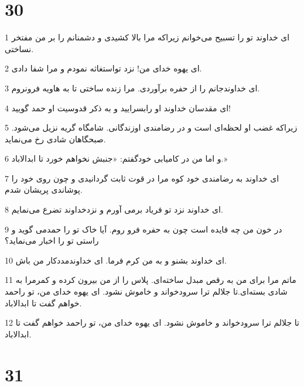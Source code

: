 \chapter{30}

\par 1 ای خداوند تو را تسبیح می‌خوانم زیراکه مرا بالا کشیدی و دشمنانم را بر من مفتخر نساختی.
\par 2 ‌ای یهوه خدای من! نزد تواستغاثه نمودم و مرا شفا دادی.
\par 3 ‌ای خداوندجانم را از حفره برآوردی. مرا زنده ساختی تا به هاویه فرونروم.
\par 4 ‌ای مقدسان خداوند او رابسرایید و به ذکر قدوسیت او حمد گویید!
\par 5 زیراکه غضب او لحظه‌ای است و در رضامندی اوزندگانی. شامگاه گریه نزیل می‌شود. صبحگاهان شادی رخ می‌نماید.
\par 6 و اما من در کامیابی خودگفتم: «جنبش نخواهم خورد تا ابدالاباد.»
\par 7 ‌ای خداوند به رضامندی خود کوه مرا در قوت ثابت گردانیدی و چون روی خود را پوشاندی پریشان شدم.
\par 8 ‌ای خداوند نزد تو فریاد برمی آورم و نزدخداوند تضرع می‌نمایم.
\par 9 در خون من چه فایده است چون به حفره فرو روم. آیا خاک تو را حمدمی گوید و راستی تو را اخبار می‌نماید؟
\par 10 ‌ای خداوند بشنو و به من کرم فرما. ای خداوندمددکار من باش.
\par 11 ماتم مرا برای من به رقص مبدل ساخته‌ای. پلاس را از من بیرون کرده و کمرمرا به شادی بسته‌ای.تا جلالم ترا سرودخواند و خاموش نشود. ای یهوه خدای من، تو راحمد خواهم گفت تا ابدالاباد.
\par 12 تا جلالم ترا سرودخواند و خاموش نشود. ای یهوه خدای من، تو راحمد خواهم گفت تا ابدالاباد.
 
\chapter{31}

